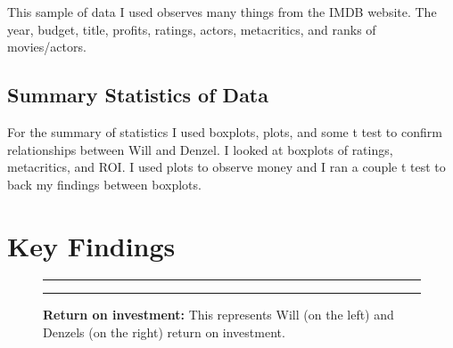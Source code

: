 \documentclass[]{article}
\begin{document}
This sample of data I used observes many things from the IMDB website.
The year, budget, title, profits, ratings, actors, metacritics, and
ranks of movies/actors.

\subsection{Summary Statistics of Data}
\label{sec:data-summary}

For the summary of statistics I used boxplots, plots, and some t test to
confirm relationships between Will and Denzel. I looked at boxplots of
ratings, metacritics, and ROI. I used plots to observe money and I ran a
couple t test to back my findings between boxplots.

\section{Key Findings}
\label{sec:findings}

\begin{figure}[!ht]
    \hrule
    \begin{center}
    \end{center}
    \label{fig:oneimage-1}
    \caption{ \textbf{Return on investment:} This represents Will (on the left) and Denzels (on the right) return on investment.}
    \hrule
\end{figure}
\end{document}
